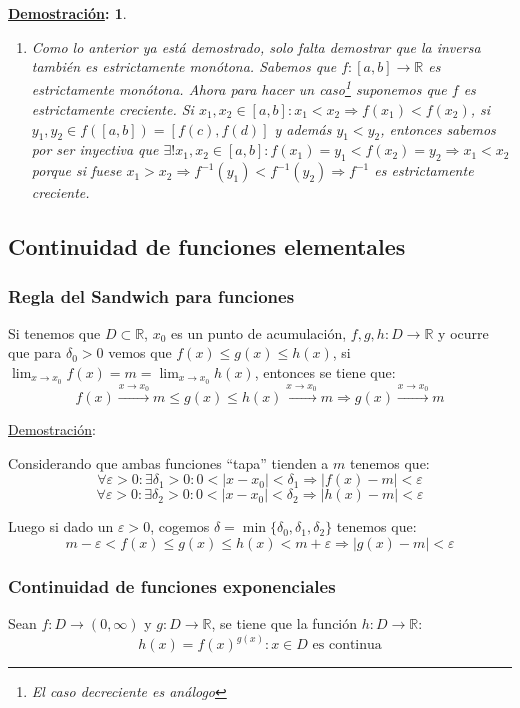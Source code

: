 \documentclass[10pt,a4paper,openright]{book}
\theoremstyle{break}
\newtheorem*{demo}{\underline{Demostración}:}
\begin{document}
\begin{demo}
\begin{enumerate}
\item Como lo anterior ya está demostrado, solo falta demostrar que la inversa también es estrictamente monótona. Sabemos que $f: [a,b]\rightarrow \mathbb R$ es estrictamente monótona. Ahora para hacer un caso\footnote{El caso decreciente es análogo} suponemos que $f$ es estrictamente creciente. Si $x_1,x_2\in [a,b]: x_1<x_2\Rightarrow f(x_1)<f(x_2)$, si $y_1,y_2\in f([a,b])=[f(c), f(d)]$ y además $y_1<y_2$, entonces sabemos por ser inyectiva que $\exists! x_1, x_2\in [a,b]: f(x_1)=y_1 < f(x_2)=y_2\Rightarrow x_1< x_2$ porque si fuese $x_1>x_2\Rightarrow f^{-1}(y_1)<f^{-1}(y_2)\Rightarrow f^{-1}$ es estrictamente creciente.
\end{enumerate} 
\end{demo}

\subsection{Continuidad de funciones elementales}
\subsubsection{Regla del Sandwich para funciones}
Si tenemos que $D\subset \mathbb R$, $x_0$ es un punto de acumulación, $f,g,h: D\rightarrow\mathbb R$ y ocurre que para $\delta_0>0$ vemos que $f(x)\leq g(x)\leq h(x)$, si $\lim_{x\rightarrow x_0} f(x)=m=\lim_{x\rightarrow x_0} h(x)$, entonces se tiene que:
$$f(x)\xrightarrow{x\rightarrow x_0} m \leq g(x)\leq h(x)\xrightarrow{x\rightarrow x_0}m\Rightarrow g(x)\xrightarrow{x\rightarrow x_0}m$$

\underline{Demostración}:\par
Considerando que ambas funciones ``tapa'' tienden a $m$ tenemos que:
$$\forall \varepsilon>0 : \exists \delta_1>0 : 0<|x-x_0|<\delta_1\Rightarrow |f(x)-m|<\varepsilon$$
$$\forall \varepsilon>0: \exists \delta_2>0: 0<|x-x_0|<\delta_2\Rightarrow |h(x)-m|<\varepsilon$$

Luego si dado un $\varepsilon>0$, cogemos $\delta=\min\{\delta_0, \delta_1,\delta_2\}$ tenemos que:
$$m-\varepsilon< f(x) \leq g(x) \leq h(x) < m+\varepsilon\Rightarrow |g(x)-m|<\varepsilon$$

\subsubsection{Continuidad de funciones exponenciales}
Sean $f: D\rightarrow (0,\infty)$ y $g: D\rightarrow \mathbb R$, se tiene que la función $h: D\rightarrow \mathbb R$:
$$h(x)=f(x)^{g(x)}: x\in D \mbox{ es continua}$$
\end{document}
